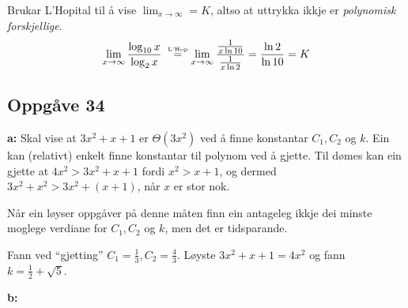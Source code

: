 \documentclass[a4paper, 11pt]{article}
\newcommand{\ceq}[2]{\stackrel{\text{\tiny{#1}}}{#2}}
\newcommand{\deloppg}[1]{\vspace{1mm}\noindent \textbf{\themecolor{#1:}}}
\newcommand{\themeshade}{Mahogany}
\newcommand{\themecolor}[1]{\textcolor{\themeshade}{#1}}
\begin{document}
\noindent Brukar L'Hopital til å vise \(\lim_{x \rightarrow \infty} = K\), altso at uttrykka ikkje
er {\em polynomisk forskjellige}.
\begin{align*}
    \lim_{x \rightarrow \infty} \frac{\log_{10}x}{\log_2 x}
        \;\ceq{L'Hop}{=} \lim_{x \rightarrow \infty} \frac{\frac{1}{x\ln 10}}{\frac{1}{x \ln 2}}
        = \frac{\ln 2}{\ln 10}
        = K
\end{align*}

\newpage
\subsection*{Oppgåve 34}

\deloppg{a} Skal vise at \(3x^2 + x + 1\) er \(\Theta(3x^2)\) ved å finne
konstantar \(C_1, C_2\) og \(k\).
Ein kan (relativt) enkelt finne konstantar til polynom ved å gjette.
Til dømes kan ein gjette at \(4x^2 > 3x^2 + x + 1\) fordi \(x^2 > x + 1\), og dermed
\(3x^2 + x^2 > 3x^2 + (x + 1)\), når \(x\) er stor nok.

Når ein løyser oppgåver på denne måten finn ein antageleg ikkje dei minste moglege verdiane for
\(C_1, C_2\) og \(k\), men det er tidsparande.

\vspace{3mm}
\noindent Fann ved ``gjetting'' \( C_1 = \frac{1}{3}, C_2 = \frac{4}{3}\). 
Løyste \(3x^2 + x + 1 = 4x^2\) og fann \(k = \frac{1}{2} + \sqrt{5}\).

\deloppg{b}
\begin{figure}[h]
    \centering
\end{figure}
\end{document}
